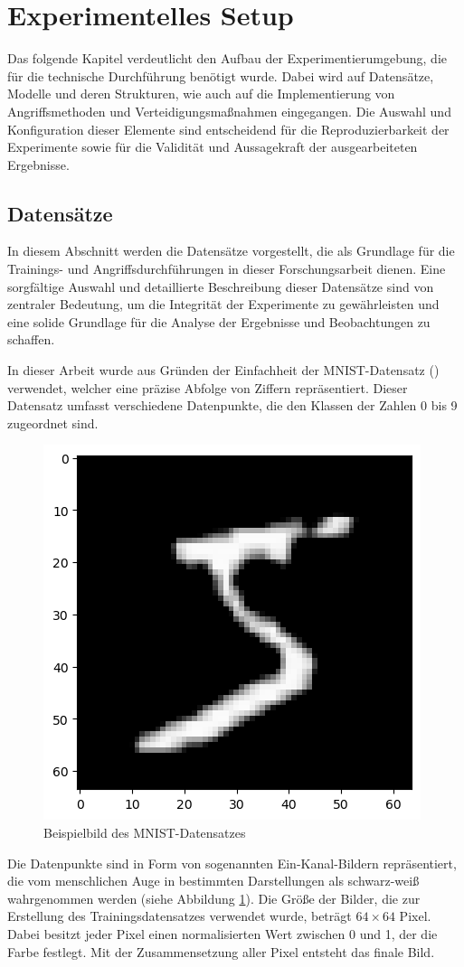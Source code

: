 \section{Experimentelles Setup}
Das folgende Kapitel verdeutlicht den Aufbau der Experimentierumgebung, die für die technische Durchführung benötigt wurde. Dabei wird auf Datensätze, Modelle und deren Strukturen, wie auch auf die Implementierung von Angriffsmethoden und Verteidigungsmaßnahmen eingegangen. Die Auswahl und Konfiguration dieser Elemente sind entscheidend für die Reproduzierbarkeit der Experimente sowie für die Validität und Aussagekraft der ausgearbeiteten Ergebnisse.
\subsection{Datensätze}\label{subsection:datensaetze}
In diesem Abschnitt werden die Datensätze vorgestellt, die als Grundlage für die Trainings- und Angriffsdurchführungen in dieser Forschungsarbeit dienen. Eine sorgfältige Auswahl und detaillierte Beschreibung dieser Datensätze sind von zentraler Bedeutung, um die Integrität der Experimente zu gewährleisten und eine solide Grundlage für die Analyse der Ergebnisse und Beobachtungen zu schaffen.

In dieser Arbeit wurde aus Gründen der Einfachheit der MNIST-Datensatz (\cite{noauthor_mnist_nodate}) verwendet, welcher eine präzise Abfolge von Ziffern repräsentiert. Dieser Datensatz umfasst verschiedene Datenpunkte, die den Klassen der Zahlen 0 bis 9 zugeordnet sind. 

\begin{figure}[H]
	\centering
	\includegraphics[width=0.2\linewidth]{Bilder/5_mnist.png}
	\caption{Beispielbild des MNIST-Datensatzes}
	\label{img:mnist}
\end{figure}

Die Datenpunkte sind in Form von sogenannten Ein-Kanal-Bildern repräsentiert, die vom menschlichen Auge in bestimmten Darstellungen als schwarz-weiß wahrgenommen werden (siehe Abbildung \ref{img:mnist}). Die Größe der Bilder, die zur Erstellung des Trainingsdatensatzes verwendet wurde, beträgt $64 \times 64$ Pixel. Dabei besitzt jeder Pixel einen normalisierten Wert zwischen 0 und 1, der die \glqq Farbe\grqq{} festlegt. Mit der Zusammensetzung aller Pixel entsteht das finale Bild.

